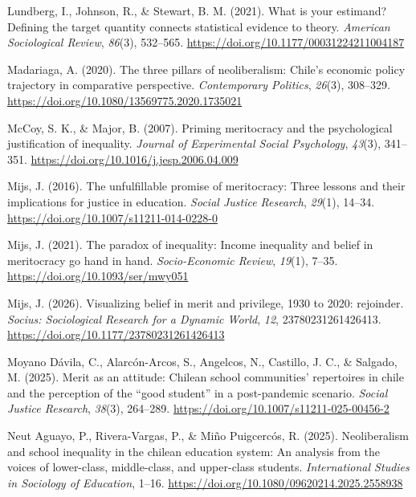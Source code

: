 \documentclass[
  13pt,
]{article}
\newlength{\cslhangindent}
\newenvironment{CSLReferences}[2] %
 {\begin{list}{}{%
  \setlength{\itemindent}{0pt}
  \setlength{\leftmargin}{0pt}
  \setlength{\parsep}{0pt}
  \ifodd #1
   \setlength{\leftmargin}{\cslhangindent}
   \setlength{\itemindent}{-1\cslhangindent}
  \fi
  \setlength{\itemsep}{#2\baselineskip}}}
 {\end{list}}
\begin{document}
\begin{CSLReferences}{1}{0}
Lundberg, I., Johnson, R., \& Stewart, B. M. (2021). What is your
estimand? Defining the target quantity connects statistical evidence to
theory. \emph{American Sociological Review}, \emph{86}(3), 532--565.
\url{https://doi.org/10.1177/00031224211004187}

Madariaga, A. (2020). The three pillars of neoliberalism: Chile's
economic policy trajectory in comparative perspective.
\emph{Contemporary Politics}, \emph{26}(3), 308--329.
\url{https://doi.org/10.1080/13569775.2020.1735021}

McCoy, S. K., \& Major, B. (2007). Priming meritocracy and the
psychological justification of inequality. \emph{Journal of Experimental
Social Psychology}, \emph{43}(3), 341--351.
\url{https://doi.org/10.1016/j.jesp.2006.04.009}

Mijs, J. (2016). The unfulfillable promise of meritocracy: Three lessons
and their implications for justice in education. \emph{Social Justice
Research}, \emph{29}(1), 14--34.
\url{https://doi.org/10.1007/s11211-014-0228-0}

Mijs, J. (2021). The paradox of inequality: Income inequality and belief
in meritocracy go hand in hand. \emph{Socio-Economic Review},
\emph{19}(1), 7--35. \url{https://doi.org/10.1093/ser/mwy051}

Mijs, J. (2026). Visualizing belief in merit and privilege, 1930 to
2020: rejoinder. \emph{Socius: Sociological Research for a Dynamic
World}, \emph{12}, 23780231261426413.
\url{https://doi.org/10.1177/23780231261426413}

Moyano Dávila, C., Alarcón-Arcos, S., Angelcos, N., Castillo, J. C., \&
Salgado, M. (2025). Merit as an attitude: Chilean school communities'
repertoires in chile and the perception of the {``good student''} in a
post-pandemic scenario. \emph{Social Justice Research}, \emph{38}(3),
264--289. \url{https://doi.org/10.1007/s11211-025-00456-2}

Neut Aguayo, P., Rivera-Vargas, P., \& Miño Puigcercós, R. (2025).
Neoliberalism and school inequality in the chilean education system: An
analysis from the voices of lower-class, middle-class, and upper-class
students. \emph{International Studies in Sociology of Education}, 1--16.
\url{https://doi.org/10.1080/09620214.2025.2558938}


\end{CSLReferences}
\end{document}
